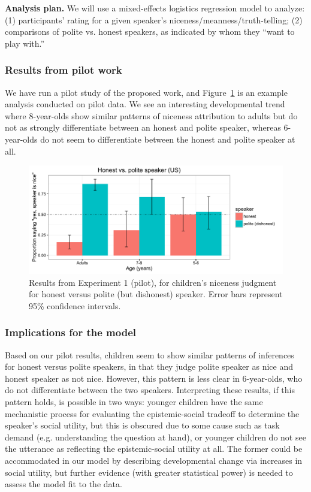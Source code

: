 {\bf Analysis plan.} We will use a mixed-effects logistics regression model to analyze: (1) participants' rating for a given speaker's niceness/meanness/truth-telling; (2) comparisons of polite vs. honest speakers, as indicated by whom they ``want to play with.''

\subsubsection{Results from pilot work}

We have run a pilot study of the proposed work, and Figure~\ref{fig:expt3} is an example analysis conducted on pilot data. We see an interesting developmental trend where 8-year-olds show similar patterns of niceness attribution to adults but  do not as strongly differentiate between an honest and polite speaker, whereas 6-year-olds do not seem to differentiate between the honest and polite speaker at all.

\begin{figure}[t]
\begin{centering}
\includegraphics[width=\textwidth]{figures/exp3.pdf}
\caption{\label{fig:expt3} Results from Experiment 1 (pilot), for children's niceness judgment for honest versus polite (but dishonest) speaker. Error bars represent 95\% confidence intervals.}
\end{centering}
\end{figure}


\subsubsection{Implications for the model}

Based on our pilot results, children seem to show similar patterns of inferences for honest versus polite speakers, in that they judge polite speaker as nice and honest speaker as not nice. However, this pattern is less clear in 6-year-olds, who do not differentiate between the two speakers. Interpreting these results, if this pattern holds, is possible in two ways: younger children have the same mechanistic process for evaluating the epistemic-social tradeoff to determine the speaker's social utility, but this is obscured due to some cause such as task demand (e.g. understanding the question at hand), or younger children do not see the utterance as reflecting the epistemic-social utility at all. The former could be accommodated in our model by describing developmental change via increases in social utility, but further evidence (with greater statistical power) is needed to assess the model fit to the data.




